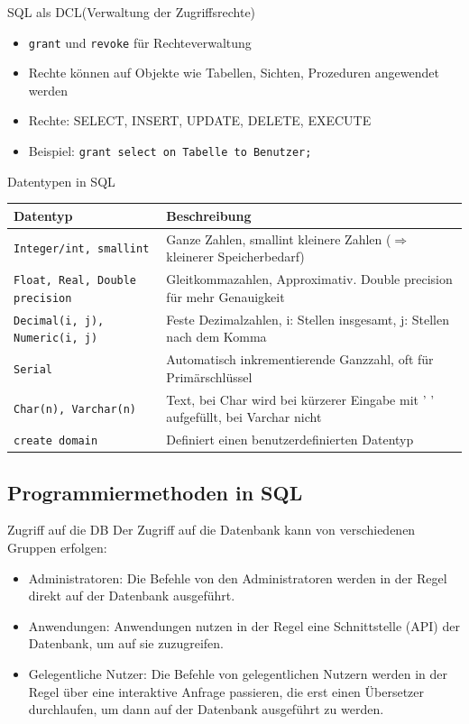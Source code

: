 \documentclass{article}
\begin{document}
\begin{block}{SQL als DCL(Verwaltung der Zugriffsrechte)}
  \begin{itemize}
    \item \texttt{grant} und \texttt{revoke} für Rechteverwaltung
    \item Rechte können auf Objekte wie Tabellen, Sichten, Prozeduren angewendet werden
    \item Rechte: SELECT, INSERT, UPDATE, DELETE, EXECUTE
    \item Beispiel: \texttt{grant select on Tabelle to Benutzer;}
  \end{itemize}
\end{block}

\begin{block}{Datentypen in SQL}
  \begin{center}
    \begin{tabular}{|p{4cm}|p{7cm}|}
      \hline
      \textbf{Datentyp} & \textbf{Beschreibung} \\
      \hline
      \texttt{Integer/int, smallint} & Ganze Zahlen, smallint kleinere Zahlen ($\Rightarrow$ kleinerer Speicherbedarf) \\
      \hline
      \texttt{Float, Real, Double precision} & Gleitkommazahlen, Approximativ. Double precision für mehr Genauigkeit \\
      \hline
      \texttt{Decimal(i, j), Numeric(i, j)} & Feste Dezimalzahlen, i: Stellen insgesamt, j: Stellen nach dem Komma \\
      \hline
      \texttt{Serial} & Automatisch inkrementierende Ganzzahl, oft für Primärschlüssel \\
      \hline
      \texttt{Char(n), Varchar(n)} & Text, bei Char wird bei kürzerer Eingabe mit ' ' aufgefüllt, bei Varchar nicht \\
      \hline
      \texttt{create domain} & Definiert einen benutzerdefinierten Datentyp \\
      \hline
    \end{tabular}
  \end{center}
\end{block}

\subsection*{Programmiermethoden in SQL}
\begin{block}{Zugriff auf die DB}
  Der Zugriff auf die Datenbank kann von verschiedenen Gruppen erfolgen:
  \begin{itemize}
    \item Administratoren: Die Befehle von den Administratoren werden in der Regel direkt auf der Datenbank ausgeführt.
    \item Anwendungen: Anwendungen nutzen in der Regel eine Schnittstelle (API) der Datenbank, um auf sie zuzugreifen.
    \item Gelegentliche Nutzer: Die Befehle von gelegentlichen Nutzern werden in der Regel über eine interaktive Anfrage passieren, die erst einen Übersetzer durchlaufen, um dann auf der Datenbank ausgeführt zu werden.
  \end{itemize}
\end{block}
\end{document}
